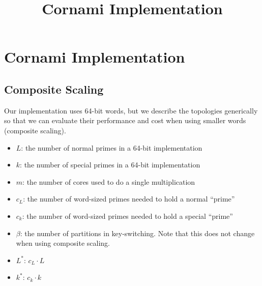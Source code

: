 \documentclass[../../fheimpl.tex]{subfiles}
\begin{document}
	\newif\ifimplismain
	\ifcompileasbook
	\else
		\hypersetup{pageanchor=false}
		\title{Cornami Implementation}
		\implismaintrue
		\maketitle
		\listoffixmes
		\tableofcontents
		\compileasbooktrue
		\hypersetup{pageanchor=true}
	\fi

\section{Cornami Implementation}

\subsection{Composite Scaling}
Our implementation uses 64-bit words, but we describe the topologies generically so that we can evaluate their performance and cost when using smaller words (composite scaling).

\begin{itemize}
    \item $L$: the number of normal primes in a 64-bit implementation
    \item $k$: the number of special primes in a 64-bit implementation
    \item $m$: the number of cores used to do a single multiplication
    \item $c_L$: the number of \textsf{word}-sized primes needed to hold a normal ``prime''
    \item $c_k$: the number of \textsf{word}-sized primes needed to hold a special ``prime''
    \item $\beta$: the number of partitions in key-switching. Note that this does not change when using composite scaling.
    \item $L^*$: $c_L\cdot L$
    \item $k^*$: $c_k\cdot k$
\end{itemize}
\end{document}
